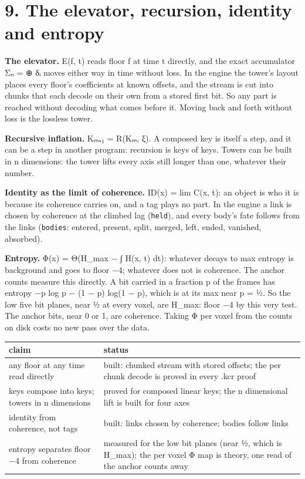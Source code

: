 \section{\texorpdfstring{9. The elevator, recursion, identity and entropy}{9. The elevator, recursion, identity and entropy}}

\textbf{The elevator.} E(f, t) reads floor f at time t directly, and the exact accumulator Σₙ = ⊕ δᵢ moves either way in time without loss. In the engine the tower's layout places every floor's coefficients at known offsets, and the stream is cut into chunks that each decode on their own from a stored first bit. So any part is reached without decoding what comes before it. Moving back and forth without loss is the lossless tower.

\textbf{Recursive inflation.} Kₘ₊₁ = R(Kₘ, ξ). A composed key is itself a step, and it can be a step in another program: recursion is keys of keys. Towers can be built in n dimensions: the tower lifts every axis still longer than one, whatever their number.

\textbf{Identity as the limit of coherence.} ID(x) = lim C(x, t): an object is who it is because its coherence carries on, and a tag plays no part. In the engine a link is chosen by coherence at the climbed lag (\texttt{held}), and every body's fate follows from the links (\texttt{bodies}: entered, present, split, merged, left, ended, vanished, absorbed).

\textbf{Entropy.} Φ(x) = Θ(H\_\allowbreak{}max − ∫ H(x, t) dt): whatever decays to max entropy is background and goes to floor −4; whatever does not is coherence. The anchor counts measure this directly. A bit carried in a fraction p of the frames has entropy −p log p − (1 − p) log(1 − p), which is at its max near p = ½. So the low five bit planes, near ½ at every voxel, are H\_\allowbreak{}max: floor −4 by this very test. The anchor bits, near 0 or 1, are coherence. Taking Φ per voxel from the counts on disk costs no new pass over the data.

{\small
\setlength{\tabcolsep}{6pt}
\begin{longtable}{>{\RaggedRight\arraybackslash}p{}>{\RaggedRight\arraybackslash}p{}}
\toprule
claim & status \\
\midrule
\endhead
any floor at any time read directly & built: chunked stream with stored offsets; the per chunk decode is proved in every .kcr proof \\
keys compose into keys; towers in n dimensions & proved for composed linear keys; the n dimensional lift is built for four axes \\
identity from coherence, not tags & built: links chosen by coherence; bodies follow links \\
entropy separates floor −4 from coherence & measured for the low bit planes (near ½, which is H\_\allowbreak{}max); the per voxel Φ map is theory, one read of the anchor counts away \\
\bottomrule
\end{longtable}
}


